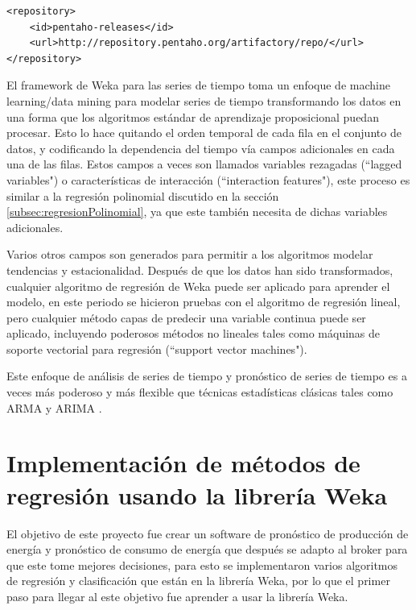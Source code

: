 \begin{lstlisting}[frame=single] 
<repository>
	<id>pentaho-releases</id>
	<url>http://repository.pentaho.org/artifactory/repo/</url>
</repository>
\end{lstlisting}
El framework de Weka para las series de tiempo toma un enfoque de machine learning/data mining para modelar series de tiempo transformando los datos en una forma que los algoritmos estándar de aprendizaje proposicional puedan procesar. Esto lo hace quitando el orden temporal de cada fila en el conjunto de datos, y codificando la dependencia del tiempo vía campos adicionales en cada una de las filas. 
Estos campos a veces son llamados variables rezagadas (``lagged variables") o características de interacción (``interaction features"), este proceso es similar a la regresión polinomial discutido en la sección \ref{subsec:regresionPolinomial}, ya que este también necesita de dichas variables adicionales. 

Varios otros campos son generados para permitir a los algoritmos modelar tendencias y estacionalidad. 
Después de que los datos han sido transformados, cualquier algoritmo de regresión de Weka puede ser aplicado para aprender el modelo, en este periodo se hicieron pruebas con el algoritmo de regresión lineal, pero cualquier método capas de predecir una variable continua puede ser aplicado, incluyendo poderosos métodos no lineales tales como  máquinas de soporte vectorial para regresión (``support vector machines"). 

Este enfoque de análisis de series de tiempo y pronóstico de series de tiempo es a veces más poderoso y más flexible que técnicas estadísticas clásicas  tales como ARMA y ARIMA \cite{pentaho}.

\section{Implementación de métodos de regresión usando la librería Weka}

El objetivo de este proyecto fue crear un software de pronóstico de producción de energía y pronóstico de consumo de energía que después se adapto al broker para que este tome mejores decisiones, para esto se implementaron varios algoritmos de regresión y clasificación que están en la librería Weka, por lo que el primer paso para llegar al este objetivo fue aprender a usar la librería Weka.

